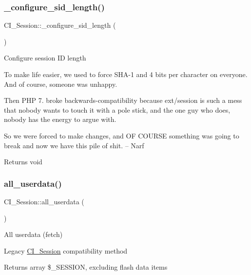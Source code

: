 \subsubsection{\texorpdfstring{\+\_\+configure\+\_\+sid\+\_\+length()}{\_configure\_sid\_length()}}
{\footnotesize\ttfamily C\+I\+\_\+\+Session\+::\+\_\+configure\+\_\+sid\+\_\+length (\begin{DoxyParamCaption}{ }\end{DoxyParamCaption})\hspace{0.3cm}{\ttfamily [protected]}}

Configure session ID length

To make life easier, we used to force S\+H\+A-\/1 and 4 bits per character on everyone. And of course, someone was unhappy.

Then P\+HP 7. broke backwards-\/compatibility because ext/session is such a mess that nobody wants to touch it with a pole stick, and the one guy who does, nobody has the energy to argue with.

So we were forced to make changes, and OF C\+O\+U\+R\+SE something was going to break and now we have this pile of shit. -- Narf

\begin{DoxyReturn}{Returns}
void 
\end{DoxyReturn}
\mbox{\label{class_c_i___session_a3e095b6745bbc9a107f0809243b73245}} 
\subsubsection{\texorpdfstring{all\+\_\+userdata()}{all\_userdata()}}
{\footnotesize\ttfamily C\+I\+\_\+\+Session\+::all\+\_\+userdata (\begin{DoxyParamCaption}{ }\end{DoxyParamCaption})}

All userdata (fetch)

Legacy \mbox{\hyperlink{class_c_i___session}{C\+I\+\_\+\+Session}} compatibility method

\begin{DoxyReturn}{Returns}
array \$\+\_\+\+S\+E\+S\+S\+I\+ON, excluding flash data items 
\end{DoxyReturn}
\mbox{\label{class_c_i___session_a1ee691085a3041a9dd06a1b55a967185}} 
